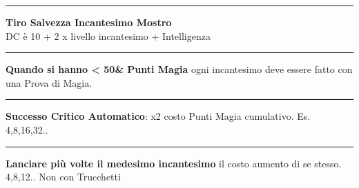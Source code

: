 \documentclass[a4paper,12 pt,openany]{book}
\newcommand{\riga}{\rule{\textwidth}{0.4pt}}
\begin{document}
\begin{textblock*}{5cm}
\riga

\textbf{Tiro Salvezza Incantesimo Mostro}\\
DC è 10 + 2 x livello incantesimo + Intelligenza

\riga

\textbf{Quando si hanno < 50\& Punti Magia} ogni incantesimo deve essere fatto con una Prova di Magia.

\riga

\textbf{Successo Critico Automatico}:  x2 costo Punti Magia cumulativo. Es. 4,8,16,32..

\riga

\textbf{Lanciare più volte il medesimo incantesimo} il costo aumento di se stesso. 4,8,12.. Non con Trucchetti

\end{textblock*}
\end{document}
